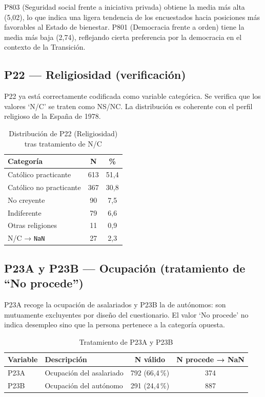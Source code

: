 \documentclass[12pt,a4paper]{article}
\newcommand{\thead}[1]{\cellcolor{tableheader}\color{white}\textbf{#1}}
\begin{document}
P803 (Seguridad social frente a iniciativa privada) obtiene la media más alta (5,02), lo que indica una ligera tendencia de los encuestados hacia posiciones más favorables al Estado de bienestar. P801 (Democracia frente a orden) tiene la media más baja (2,74), reflejando cierta preferencia por la democracia en el contexto de la Transición.

\subsection{P22 — Religiosidad (verificación)}

P22 ya está correctamente codificada como variable categórica. Se verifica que los valores `N/C' se traten como NS/NC. La distribución es coherente con el perfil religioso de la España de 1978.

\begin{table}[H]
\centering
\renewcommand{\arraystretch}{1.3}
\begin{tabular}{lcc}
\toprule
\thead{Categoría} & \thead{N} & \thead{\%} \\
\midrule
Católico practicante     & 613 & 51,4 \\
\rowcolor{tablerow}
Católico no practicante  & 367 & 30,8 \\
No creyente              &  90 &  7,5 \\
\rowcolor{tablerow}
Indiferente              &  79 &  6,6 \\
Otras religiones         &  11 &  0,9 \\
\rowcolor{tablerow}
N/C → \texttt{NaN}       &  27 &  2,3 \\
\bottomrule
\end{tabular}
\caption{Distribución de P22 (Religiosidad) tras tratamiento de N/C}
\end{table}

\subsection{P23A y P23B — Ocupación (tratamiento de ``No procede'')}

P23A recoge la ocupación de asalariados y P23B la de autónomos: son mutuamente excluyentes por diseño del cuestionario. El valor `No procede' no indica desempleo sino que la persona pertenece a la categoría opuesta.

\begin{table}[H]
\centering
\renewcommand{\arraystretch}{1.3}
\begin{tabularx}{\linewidth}{p{2cm} X cc}
\toprule
\thead{Variable} & \thead{Descripción} & \thead{N válido} & \thead{N procede → NaN} \\
\midrule
P23A & Ocupación del asalariado  & 792 (66,4\,\%) & 374 \\
\rowcolor{tablerow}
P23B & Ocupación del autónomo    & 291 (24,4\,\%) & 887 \\
\bottomrule
\end{tabularx}
\caption{Tratamiento de P23A y P23B}
\end{table}
\end{document}
